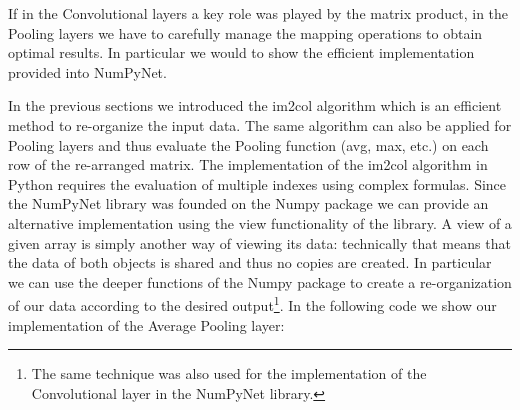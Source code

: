 \documentclass{standalone}
\begin{document}
If in the Convolutional layers a key role was played by the matrix product, in the Pooling layers we have to carefully manage the mapping operations to obtain optimal results.
In particular we would to show the efficient implementation provided into \textsf{NumPyNet}.

In the previous sections we introduced the \textsf{im2col} algorithm which is an efficient method to re-organize the input data.
The same algorithm can also be applied for Pooling layers and thus evaluate the Pooling function (avg, max, etc.) on each row of the re-arranged matrix.
The implementation of the \textsf{im2col} algorithm in \textsf{Python} requires the evaluation of multiple indexes using complex formulas.
Since the \textsf{NumPyNet} library was founded on the \textsf{Numpy} package we can provide an alternative implementation using the \textsf{view} functionality of the library.
A \textsf{view} of a given array is simply another way of viewing its data: technically that means that the data of both objects is shared and thus no copies are created.
In particular we can use the deeper functions of the \textsf{Numpy} package to create a re-organization of our data according to the desired output\footnote{
  The same technique was also used for the implementation of the Convolutional layer in the \textsf{NumPyNet} library.
}.
In the following code we show our implementation of the Average Pooling layer:
\end{document}
